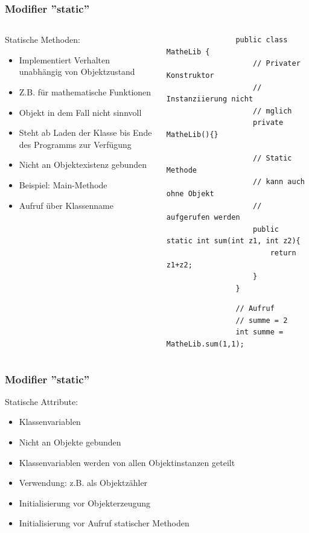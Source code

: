 \begin{frame}[fragile]
	  \frametitle{Modifier ''static''}
		 \begin{columns}
		 \begin{column}{0.5\textwidth}
			  \small
			  Statische Methoden:
			  \begin{itemize}
			  	\item Implementiert Verhalten unabh\"angig
			  	von Objektzustand
			  	\item Z.B. f\"ur mathematische Funktionen
			  	\item Objekt in dem Fall nicht sinnvoll
			  	\item Steht ab Laden der Klasse bis Ende des
			  	Programms zur Verf\"ugung
			  	\item Nicht an Objektexistenz gebunden
			  	\item Beispiel: Main-Methode
			  	\item Aufruf \"uber Klassenname
			  \end{itemize}
		 \end{column}
		 \begin{column}{0.5\textwidth}
		 	\begin{lstlisting}
		 		public class MatheLib {
		 			// Privater Konstruktor
		 			// Instanziierung nicht
		 			// mglich
		 			private MatheLib(){}
		 			
		 			// Static Methode
		 			// kann auch ohne Objekt
		 			// aufgerufen werden
		 			public static int sum(int z1, int z2){
		 				return z1+z2;
		 			}
		 		}
		 	\end{lstlisting}
		 	
		 	\begin{lstlisting}
		 		// Aufruf
		 		// summe = 2
		 		int summe = MatheLib.sum(1,1);
		 	\end{lstlisting}
		 \end{column}
		 \end{columns}
\end{frame}

\begin{frame}[fragile]
	  \frametitle{Modifier ''static''}
		  \small
		  Statische Attribute:
		  \begin{itemize}
		    \item Klassenvariablen
		  	\item Nicht an Objekte gebunden
		  	\item Klassenvariablen werden von allen
		  	Objektinstanzen geteilt
		  	\item Verwendung: z.B. als Objektz\"ahler
		  	\item Initialisierung vor Objekterzeugung
		  	\item Initialisierung vor Aufruf statischer
		  	Methoden
		  \end{itemize}
\end{frame}

